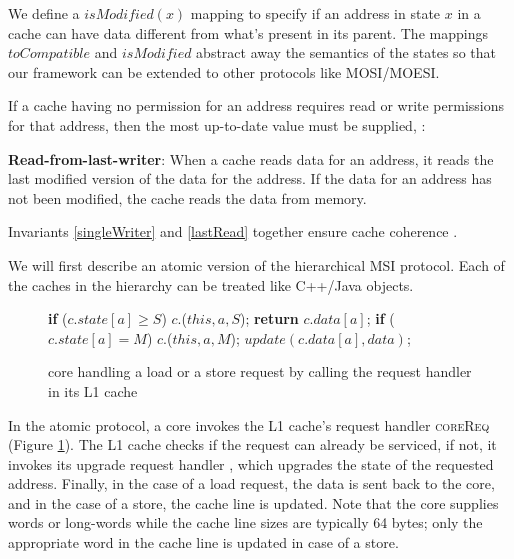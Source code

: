 We define a $isModified(x)$ mapping to specify if an address in state $x$ in a
cache can have data different from what's present in its parent. The mappings
$toCompatible$ and $isModified$ abstract away the semantics of the states so
that our framework can be extended to other protocols like MOSI/MOESI.

If a cache having no permission for an address requires read or write
permissions for that address, then the most up-to-date value must be supplied,
\ie:

\begin{inv}
\textbf{Read-from-last-writer}: When a cache reads data for an address, it reads
the last modified version of the data for the address. If the data for an
address has not been modified, the cache reads the data from memory.
\label{lastRead}
\end{inv}

Invariants \ref{singleWriter} and \ref{lastRead} together ensure cache coherence
\cite{Patterson}.

We will first describe an atomic version of the hierarchical MSI protocol. Each
of the caches in the hierarchy can be treated like C++/Java objects.

\begin{figure}
\small
\begin{algorithmic}
    \State \textbf{if} ($c.state[a] \ge S$)
    \State \;\;\;\; \call{} $c.$\uReq($this, a, S$);
    \State \textbf{return} $c.data[a]$;
    \State \textbf{if} ($c.state[a] = M$)
    \State \;\;\;\; \call{} $c.$\uReq($this, a, M$);
    \State $update(c.data[a], data)$;
  \EndIf
\EndProc
\end{algorithmic}
\caption{core handling a load or a store request by calling the request
handler in its L1 cache}
\label{coreHandle}
\end{figure}

In the atomic protocol, a core invokes the L1 cache's request handler
\textsc{coreReq} (Figure \ref{coreHandle}). The L1 cache checks if the request
can already be serviced, if not, it invokes its upgrade request handler \uReq{},
which upgrades the state of the requested address. Finally, in the case of a
load request, the data is sent back to the core, and in the case of a store, the
cache line is updated. Note that the core supplies words or long-words while the
cache line sizes are typically 64 bytes; only the appropriate word in the cache
line is updated in case of a store.

